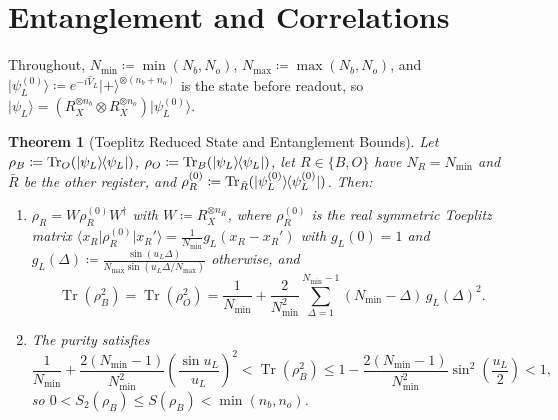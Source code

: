 \documentclass[11pt,a4paper]{article}
\theoremstyle{plain}
\newtheorem{theorem}{Theorem}[section]
\theoremstyle{definition}
\theoremstyle{remark}
\newcommand{\Tr}{\operatorname{Tr}}
\newcommand{\ket}[1]{\lvert#1\rangle}
\newcommand{\bra}[1]{\langle#1\rvert}
\newcommand{\ketbra}[2]{\lvert#1\rangle\mkern-2mu\langle#2\rvert}
\newcommand{\proj}[1]{\ketbra{#1}{#1}}
\begin{document}
\clearpage
\section{Entanglement and Correlations}\label{sec:entanglement}

Throughout, \( N_{\min} \coloneqq \min(N_b, N_o) \), \( N_{\max} \coloneqq \max(N_b, N_o) \),
and \( \ket{\psi_L^{(0)}} \coloneqq e^{-i\hat{V}_L}\ket{+}^{\otimes (n_b + n_o)} \) is the state
before readout, so \( \ket{\psi_L} = (R_X^{\otimes n_b} \otimes R_X^{\otimes n_o})\ket{\psi_L^{(0)}} \).

\begin{theorem}[Toeplitz Reduced State and Entanglement Bounds]\label{thm:entanglement}
  Let \( \rho_B \coloneqq \Tr_O(\proj{\psi_L}) \), \( \rho_O \coloneqq \Tr_B(\proj{\psi_L}) \),
  let \( R \in \{B, O\} \) have \( N_R = N_{\min} \) and \( \bar{R} \) be the other register, and
  \( \rho_R^{(0)} \coloneqq \Tr_{\bar{R}}(\proj{\psi_L^{(0)}}) \). Then:
  \begin{enumerate}
    \item \( \rho_R = W \rho_R^{(0)} W^\dagger \) with \( W \coloneqq R_X^{\otimes n_R} \), where
      \( \rho_R^{(0)} \) is the real symmetric Toeplitz matrix
      \( \bra{x_R}\rho_R^{(0)}\ket{x_R'} = \frac{1}{N_{\min}} g_L(x_R - x_R') \) with
      \( g_L(0) = 1 \) and \( g_L(\Delta) \coloneqq \frac{\sin(u_L \Delta)}{N_{\max}
      \sin(u_L \Delta / N_{\max})} \) otherwise, and
      \begin{equation}\label{eq:purity}
        \Tr(\rho_B^2) = \Tr(\rho_O^2) = \frac{1}{N_{\min}} +
        \frac{2}{N_{\min}^2}\sum_{\Delta=1}^{N_{\min} - 1} (N_{\min} - \Delta)\, {g_L(\Delta)}^2.
      \end{equation}
    \item The purity satisfies
      \begin{equation}\label{eq:purity-bounds}
        \frac{1}{N_{\min}} + \frac{2(N_{\min} - 1)}{N_{\min}^2}{\left(\frac{\sin u_L}{u_L}\right)}^2
        < \Tr(\rho_B^2) \le
        1 - \frac{2(N_{\min} - 1)}{N_{\min}^2}\sin^2\left(\frac{u_L}{2}\right) < 1,
      \end{equation}
      so \( 0 < S_2(\rho_B) \le S(\rho_B) < \min(n_b, n_o) \).
  \end{enumerate}
\end{theorem}
\end{document}
